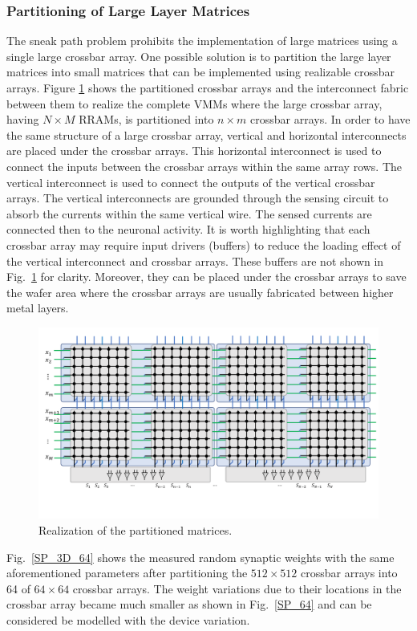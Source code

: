 \documentclass[english]{article}
\newcommand{\reffig}[1]{{Fig.~\ref{#1}}}
\begin{document}
\subsubsection{Partitioning of Large Layer Matrices}
The sneak path problem prohibits the implementation of large matrices using a single large crossbar array. One possible solution is to partition the large layer matrices into small matrices that can be implemented using realizable crossbar arrays. Figure \ref{fig:partioning} shows the partitioned crossbar arrays and the interconnect fabric between them to realize the complete VMMs where the large crossbar array, having $N\times M$ RRAMs, is partitioned into $n\times m$ crossbar arrays.
In order to have the same structure of a large crossbar array, vertical and horizontal interconnects are placed under the crossbar arrays. This horizontal interconnect is used to connect the inputs between the crossbar arrays within the same array rows. The vertical interconnect is used to connect the outputs of the vertical crossbar arrays. The vertical interconnects are grounded through the sensing circuit to absorb the currents within the same vertical wire. The sensed currents are connected then to the neuronal activity. It is worth highlighting that each crossbar array may require input drivers (buffers) to reduce the loading effect of the vertical interconnect and crossbar arrays. These buffers are not shown in \reffig{fig:partioning} for clarity.  Moreover, they can be placed under the crossbar arrays to save the wafer area where the crossbar arrays are usually fabricated between higher metal layers.   %
\begin{figure}[!h]
\centering
\includegraphics[width=\linewidth]{Partition}%
\caption{Realization of the partitioned matrices. 
\label{fig:partioning}
  }
\vspace{-0.2in}
\end{figure}   
%
\reffig{SP_3D_64} shows the measured random synaptic weights with the same aforementioned parameters after partitioning the $512\times 512$ crossbar arrays into 64 of $64\times 64$ crossbar arrays. The weight variations due to their locations in the crossbar array became much smaller as shown in \reffig{SP_64} and can be considered be modelled with the device variation.  
\end{document}
